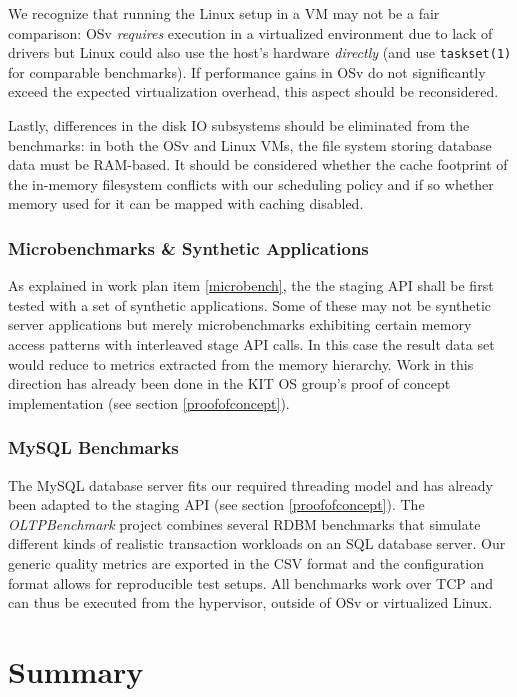 \documentclass{article}
\begin{document}
We recognize that running the Linux setup in a VM may not be a fair comparison:
OSv \emph{requires} execution in a virtualized environment due to lack of drivers
but Linux could also use the host's hardware \emph{directly} (and use \texttt{taskset(1)} for comparable benchmarks).
If performance gains in OSv do not significantly exceed the expected virtualization overhead, this aspect should be reconsidered.

Lastly, differences in the disk IO subsystems should be eliminated from the benchmarks:
in both the OSv and Linux VMs, the file system storing database data must be RAM-based.
It should be considered whether the cache footprint of the in-memory filesystem conflicts with our scheduling policy
and if so whether memory used for it can be mapped with caching disabled.

\subsubsection{Microbenchmarks \& Synthetic Applications}

As explained in work plan item \ref{microbench}, the the staging API shall be first tested with a set of synthetic
applications.
Some of these may not be synthetic server applications but merely microbenchmarks exhibiting certain memory access patterns
with interleaved stage API calls.
In this case the result data set would reduce to metrics extracted from the memory hierarchy.
Work in this direction has already been done in the KIT OS group's proof of concept implementation
(see section \ref{proofofconcept}).


\subsubsection{MySQL Benchmarks}

The MySQL database server fits our required threading model and has already been adapted to the staging API
(see section \ref{proofofconcept}).
The \textit{OLTPBenchmark} project \cite{oltpbench} combines several RDBM benchmarks that simulate different kinds of
realistic transaction workloads on an SQL database server.
Our generic quality metrics are exported in the CSV format and the configuration format allows for reproducible test
setups.
All benchmarks work over TCP and can thus be executed from the hypervisor, outside of OSv or virtualized Linux.

\section{Summary}
\end{document}

